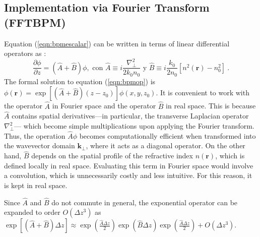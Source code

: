 \subsection{Implementation via Fourier Transform (FFTBPM)}
Equation (\ref{eqn:bpmescalar}) can be written in terms of linear differential operators as \citep{bpm}:
\begin{equation}
	\frac{\partial \phi}{\partial z}  = \left(\hat{A} + \hat{B}\right)\phi, \text{ con } \hat{A} \equiv i\frac{\nabla^2_\perp}{2k_0n_0}\text{ y } \hat{B} \equiv i\frac{k_0}{2n_0}\left[n^2(\textbf{r})-n_0^2\right] \ . \label{eqn:bpmop}
\end{equation}
The formal solution to equation (\ref{eqn:bpmop}) is $\phi(\textbf{r}) = \exp\left[\left(\hat{A} + \hat{B}\right)(z-z_0)\right]\phi(x, y, z_0)$. It is convenient to work with the operator \( \hat{A} \) in Fourier space and the operator \( \hat{B} \) in real space. This is because \( \hat{A} \) contains spatial derivatives—in particular, the transverse Laplacian operator \( \nabla^2_\perp \)— which become simple multiplications upon applying the Fourier transform. Thus, the operation \( \hat{A} \phi \) becomes computationally efficient when transformed into the wavevector domain \( \textbf{k}_\perp \), where it acts as a diagonal operator. On the other hand, \( \hat{B} \) depends on the spatial profile of the refractive index \( n(\textbf{r}) \), which is defined locally in real space. Evaluating this term in Fourier space would involve a convolution, which is unnecessarily costly and less intuitive. For this reason, it is kept in real space.

Since $\hat{A}$ and $\hat{B}$ do not commute in general, the exponential operator can be expanded to order $O(\Delta z ^3)$ as $\exp\left[\left(\hat{A} + \hat{B}\right)\Delta z \right] \approx \exp\left(\frac{\hat{A}\Delta z}{2} \right)\exp\left(\hat{B}\Delta z \right)\exp\left(\frac{\hat{A}\Delta z}{2} \right) + O(\Delta z ^3)$.

